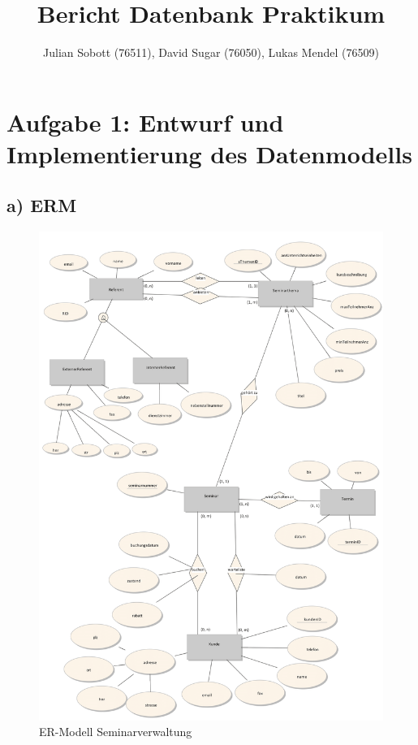 \documentclass[10pt,a4paper]{article}
\author{Julian Sobott (76511), David Sugar (76050), Lukas Mendel (76509)}
\title{Bericht Datenbank Praktikum}
\begin{document}
\maketitle
\tableofcontents

\newpage
\section{Aufgabe 1: Entwurf und Implementierung des Datenmodells}
\subsection{a) ERM}

\begin{figure}[ht!]
	\includegraphics[scale=0.2]{Bilder/ER-Modell.PNG}
	\caption{ER-Modell Seminarverwaltung}
	\label{er:1}
\end{figure}
\end{document}
